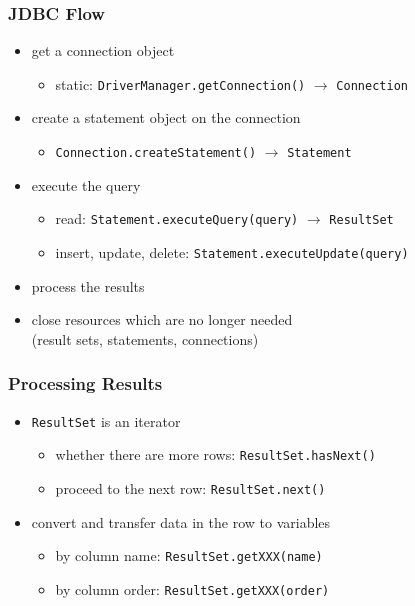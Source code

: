 \documentclass[dvipsnames]{beamer}
\theoremstyle{plain}
\begin{document}
\begin{frame}
  \frametitle{JDBC Flow}

  \begin{itemize}
    \item get a connection object
    \begin{itemize}
      \item static: \lstinline!DriverManager.getConnection()!
	$\rightarrow$ \lstinline!Connection!
    \end{itemize}

    \pause
    \item create a statement object on the connection
    \begin{itemize}
      \item \lstinline!Connection.createStatement()!
	 $\rightarrow$ \lstinline!Statement!
    \end{itemize}

    \pause
    \item execute the query
    \begin{itemize}
      \item read: \lstinline!Statement.executeQuery(query)!
	$\rightarrow$ \lstinline!ResultSet!
      \item insert, update, delete: \lstinline!Statement.executeUpdate(query)!
    \end{itemize}

    \pause
    \item process the results

    \pause
    \item close resources which are no longer needed\\
      (result sets, statements, connections)
  \end{itemize}
\end{frame}

\begin{frame}
  \frametitle{Processing Results}

  \begin{itemize}
    \item \lstinline!ResultSet! is an iterator
    \begin{itemize}
      \item whether there are more rows: \lstinline!ResultSet.hasNext()!
      \item proceed to the next row: \lstinline!ResultSet.next()!
    \end{itemize}

    \pause
    \medskip
    \item convert and transfer data in the row to variables
    \begin{itemize}
      \item by column name: \lstinline!ResultSet.getXXX(name)!
      \item by column order: \lstinline!ResultSet.getXXX(order)!
    \end{itemize}
  \end{itemize}
\end{frame}
\end{document}
